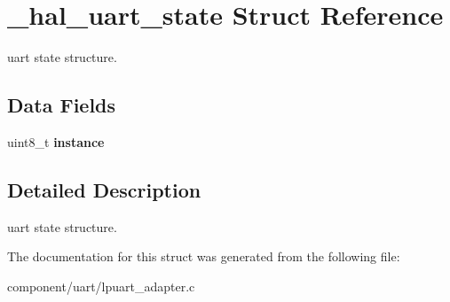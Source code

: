 \hypertarget{struct__hal__uart__state}{}\section{\+\_\+hal\+\_\+uart\+\_\+state Struct Reference}
\label{struct__hal__uart__state}


uart state structure.  


\subsection*{Data Fields}
\begin{DoxyCompactItemize}
\item 
\mbox{\label{struct__hal__uart__state_a0247bf27ecd553eeb029a06b1e6ec354}} 
uint8\+\_\+t {\bfseries instance}
\end{DoxyCompactItemize}


\subsection{Detailed Description}
uart state structure. 

The documentation for this struct was generated from the following file\+:\begin{DoxyCompactItemize}
\item 
component/uart/lpuart\+\_\+adapter.\+c\end{DoxyCompactItemize}
